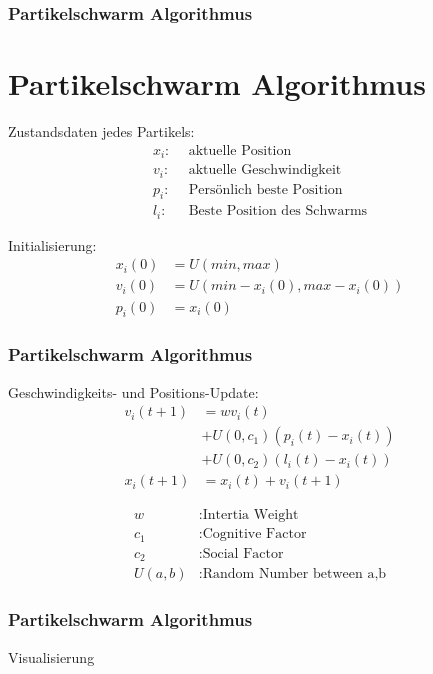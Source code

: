 \begin{frame}
	\frametitle{Partikelschwarm Algorithmus}
	
	\section[Algorithmus]{Partikelschwarm Algorithmus}
	Zustandsdaten jedes Partikels:
	\begin{align*}
		x_i: \: \: & \text{aktuelle Position}\\
		v_i: \: \: & \text{aktuelle Geschwindigkeit}\\
		p_i: \: \: & \text{Persönlich beste Position} \\
		l_i: \: \: & \text{Beste Position des Schwarms}
	\end{align*}
	

	Initialisierung:
	\begin{align*}
		x_i(0) &= U(min,max) \\
		v_i(0) &= U(min - x_i(0), max - x_i(0)) \\
		p_i(0) &= x_i(0)
	\end{align*}
	
\end{frame}

\begin{frame}
	\frametitle{Partikelschwarm Algorithmus}
	Geschwindigkeits- und Positions-Update:
	\begin{align*}
		v_i(t+1) &= w v_i(t) \\
				&+ U(0,c_1) \left(p_i(t)-x_i(t) \right) \\
				&+ U(0,c_2) \left(l_i(t)-x_i(t) \right) \\
		x_{i}(t+1) &= x_i(t) + v_i(t+1)
	\end{align*}

	\begin{align*}
		w &: \text{Intertia Weight} \\
		c_1 &: \text{Cognitive Factor} \\
		c_2 &: \text{Social Factor} \\
		U(a,b) &: \text{Random Number between a,b}
	\end{align*}	
\end{frame}

\begin{frame}
	\frametitle{Partikelschwarm Algorithmus}
	Visualisierung
	\begin{figure}[htbp]
		
	\end{figure}
\end{frame}